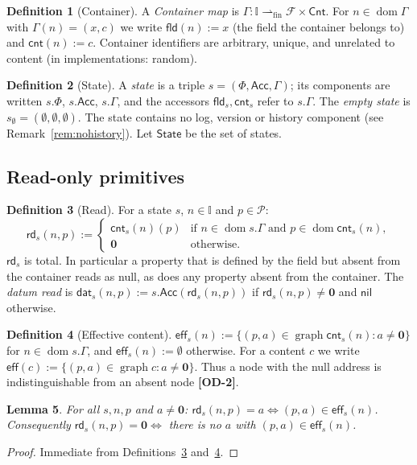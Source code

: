 \documentclass[11pt,a4paper]{article}
\theoremstyle{definition}
\newtheorem{definition}{Definition}[section]
\theoremstyle{plain}
\newtheorem{lemma}[definition]{Lemma}
\theoremstyle{remark}
\newcommand{\od}[1]{\textsf{\textbf{\textcolor{BrickRed}{[OD-#1]}}}}
\newcommand{\Idn}{\mathbb{I}}
\newcommand{\Prp}{\mathcal{P}}
\newcommand{\Fld}{\mathcal{F}}
\newcommand{\Cnt}{\mathsf{Cnt}}
\newcommand{\Stt}{\mathsf{State}}
\newcommand{\nul}{\mathbf{0}}
\newcommand{\nil}{\mathsf{nil}}
\newcommand{\pfin}{\rightharpoonup_{\mathrm{fin}}}
\newcommand{\dom}{\operatorname{dom}}
\newcommand{\graph}{\operatorname{graph}}
\newcommand{\rd}{\mathsf{rd}}
\newcommand{\eff}{\mathsf{eff}}
\newcommand{\fld}{\mathsf{fld}}
\newcommand{\cnt}{\mathsf{cnt}}
\newcommand{\Acc}{\mathsf{Acc}}
\begin{document}
\begin{definition}[Container]\label{def:container}
A \emph{Container map} is $\Gamma:\Idn\pfin\Fld\times\Cnt$.
For $n\in\dom\Gamma$ with $\Gamma(n)=(x,c)$ we write $\fld(n):=x$ (the field the container belongs to) and $\cnt(n):=c$.
Container identifiers are arbitrary, unique, and unrelated to content (in implementations: random).
\end{definition}

\begin{definition}[State]\label{def:state}
A \emph{state} is a triple $s=(\Phi,\Acc,\Gamma)$; its components are written $s.\Phi$, $s.\Acc$, $s.\Gamma$,
and the accessors $\fld_s,\cnt_s$ refer to $s.\Gamma$. The \emph{empty state} is $s_\emptyset=(\emptyset,\emptyset,\emptyset)$.
The state contains no log, version or history component (see Remark~\ref{rem:nohistory}).
Let $\Stt$ be the set of states.
\end{definition}

\subsection{Read-only primitives}

\begin{definition}[Read]\label{def:read}
For a state $s$, $n\in\Idn$ and $p\in\Prp$:
\[
\rd_s(n,p):=
\begin{cases}
\cnt_s(n)(p) & \text{if } n\in\dom s.\Gamma \text{ and } p\in\dom\cnt_s(n),\\
\nul & \text{otherwise.}
\end{cases}
\]
$\rd_s$ is total. In particular a property that is defined by the field but absent from the container reads as null,
as does any property absent from the container.
The \emph{datum read} is $\mathsf{dat}_s(n,p):=s.\Acc(\rd_s(n,p))$ if $\rd_s(n,p)\neq\nul$ and $\nil$ otherwise.
\end{definition}

\begin{definition}[Effective content]\label{def:eff}
$\eff_s(n):=\{(p,a)\in\graph\cnt_s(n) : a\neq\nul\}$ for $n\in\dom s.\Gamma$, and $\eff_s(n):=\emptyset$ otherwise.
For a content $c$ we write $\eff(c):=\{(p,a)\in\graph c : a\neq\nul\}$.
Thus a node with the null address is indistinguishable from an absent node \od{2}.
\end{definition}

\begin{lemma}\label{lem:eff}
For all $s,n,p$ and $a\neq\nul$: $\rd_s(n,p)=a \iff (p,a)\in\eff_s(n)$. Consequently
$\rd_s(n,p)=\nul \iff$ there is no $a$ with $(p,a)\in\eff_s(n)$.
\end{lemma}
\begin{proof}
Immediate from Definitions~\ref{def:read} and~\ref{def:eff}.
\end{proof}
\end{document}

